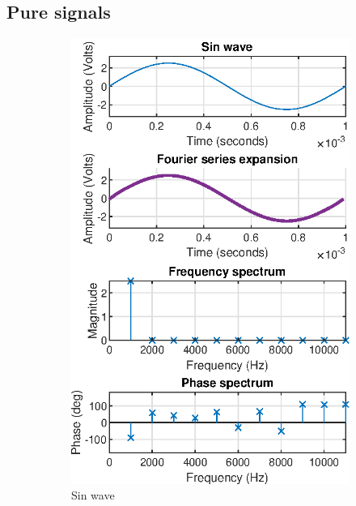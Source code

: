 \documentclass[notitlepage, a4paper, 11pt]{article}
\begin{document}
	\subsection{Pure signals}
	\begin{figure}[H]
		\centering
		\begin{subfigure}[][][t]{0.23\textwidth}
			\includegraphics[width=\textwidth]{../Matlab/img/sin}
			\caption{Sin wave}
		\end{subfigure}
		\hfill
		\begin{subfigure}[][][t]{0.23\textwidth}

\end{subfigure}
\end{figure}
\end{document}
